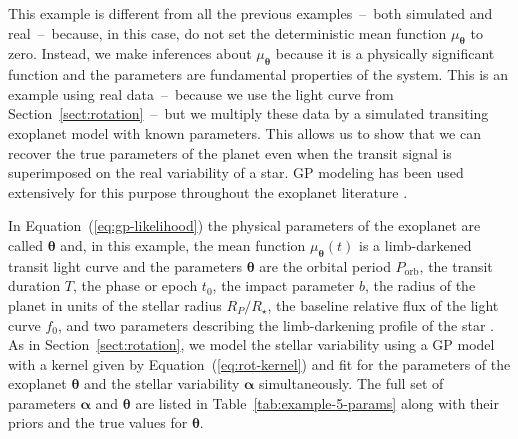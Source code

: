 \documentclass[manuscript, letterpaper]{aastex6}
\renewcommand{\eqref}[1]{\ref{eq:#1}}
\newcommand{\Eq}[1]{Equation~(\eqref{#1})}
\newcommand{\eq}[1]{\Eq{#1}}
\newcommand{\sectionname}{Section}
\newcommand{\sectref}[1]{\ref{sect:#1}}
\newcommand{\Sect}[1]{\sectionname~\sectref{#1}}
\newcommand{\sect}[1]{\Sect{#1}}
\newcommand{\bvec}[1]{{\ensuremath{\boldsymbol{#1}}}}
\newcommand{\response}[1]{{\color{blue}#1}}
\begin{document}
\response{
This example is different from all the previous examples~--~both simulated and
real~--~because, in this case, do not set the deterministic
mean function $\mu_\bvec{\theta}$ to zero.
Instead, we make inferences about $\mu_\bvec{\theta}$ because it is a
physically significant function and the parameters are fundamental properties
of the system.
This is an example using real data~--~because we use the light curve from
\sect{rotation}~--~but we multiply these data by a simulated transiting
exoplanet model with known parameters.
This allows us to show that we can recover the true parameters of the planet
even when the transit signal is superimposed on the real variability of a
star.
}
GP modeling has been used extensively for this purpose throughout the
exoplanet literature \citep[for example][]{Dawson:2014, Barclay:2015,
Evans:2015, Foreman-Mackey:2016b, Grunblatt:2016}.

In \eq{gp-likelihood} the physical parameters of the exoplanet are called
$\bvec{\theta}$ and, in this example, the mean function $\mu_\bvec{\theta}(t)$
is a limb-darkened transit light curve \citep{Mandel:2002,
Foreman-Mackey:2016a} and the parameters $\bvec{\theta}$ are the orbital
period $P_\mathrm{orb}$, the transit duration $T$, the phase or epoch $t_0$,
the impact parameter $b$, the radius of the planet in units of the stellar
radius $R_P/R_\star$, the baseline relative flux of the light curve $f_0$, and
two parameters describing the limb-darkening profile of the star
\citep{Claret:2011, Kipping:2013}.
As in \sect{rotation}, we model the stellar variability using a GP model
with a kernel given by \eq{rot-kernel} and fit for the parameters of the
exoplanet $\bvec{\theta}$ and the stellar variability $\bvec{\alpha}$
simultaneously.
\response{The full set of parameters $\bvec{\alpha}$ and $\bvec{\theta}$ are
listed in Table~\ref{tab:example-5-params} along with their priors and the
true values for $\bvec{\theta}$.}
\end{document}
